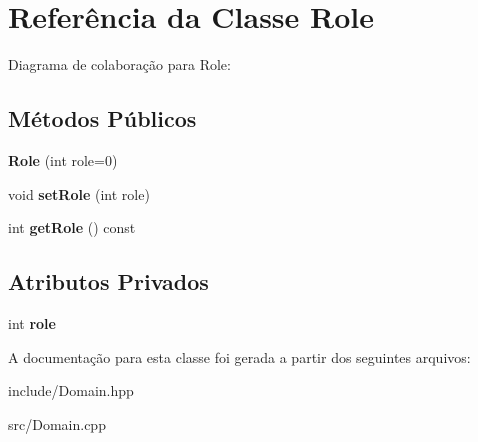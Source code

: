 \hypertarget{classRole}{}\section{Referência da Classe Role}
\label{classRole}


Diagrama de colaboração para Role\+:
\subsection*{Métodos Públicos}
\begin{DoxyCompactItemize}
\item 
{\bfseries Role} (int role=0)\hypertarget{classRole_a70253cfd20a49f15e2af380ac04e845d}{}\label{classRole_a70253cfd20a49f15e2af380ac04e845d}

\item 
void {\bfseries set\+Role} (int role)\hypertarget{classRole_a202ba4ab34f0b4cdefc9a434f3e58f86}{}\label{classRole_a202ba4ab34f0b4cdefc9a434f3e58f86}

\item 
int {\bfseries get\+Role} () const \hypertarget{classRole_a9e7769617e1a42323d0b752bbe13b721}{}\label{classRole_a9e7769617e1a42323d0b752bbe13b721}

\end{DoxyCompactItemize}
\subsection*{Atributos Privados}
\begin{DoxyCompactItemize}
\item 
int {\bfseries role}\hypertarget{classRole_a19a26703a0776f3ee79ce0e057b908cb}{}\label{classRole_a19a26703a0776f3ee79ce0e057b908cb}

\end{DoxyCompactItemize}


A documentação para esta classe foi gerada a partir dos seguintes arquivos\+:\begin{DoxyCompactItemize}
\item 
include/Domain.\+hpp\item 
src/Domain.\+cpp\end{DoxyCompactItemize}
